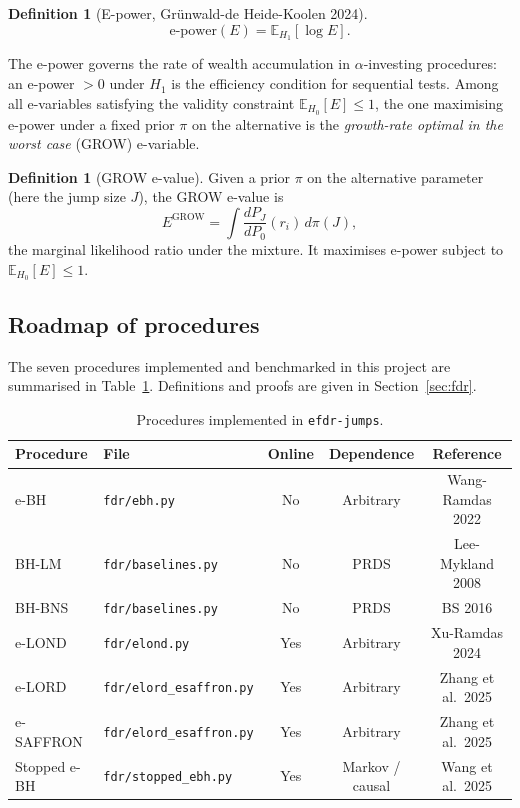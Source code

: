 \documentclass[11pt,a4paper,twocolumn]{article}
\theoremstyle{plain}
\theoremstyle{definition}
\newtheorem{definition}[theorem]{Definition}
\theoremstyle{remark}
\newcommand{\E}{\mathbb{E}}
\begin{document}
\begin{definition}[E-power, Gr\"unwald-de Heide-Koolen 2024]
\[
  \mathrm{e\text{-}power}(E) = \E_{H_1}[\log E].
\]
\end{definition}

The e-power governs the rate of wealth accumulation in $\alpha$-investing
procedures: an e-power $> 0$ under $H_1$ is the efficiency condition for
sequential tests. Among all e-variables satisfying the validity constraint
$\E_{H_0}[E] \le 1$, the one maximising e-power under a fixed prior $\pi$ on
the alternative is the \emph{growth-rate optimal in the worst case} (GROW)
e-variable.

\begin{definition}[GROW e-value]
Given a prior $\pi$ on the alternative parameter (here the jump size $J$),
the GROW e-value is
\[
  E^{\mathrm{GROW}} = \int \frac{dP_J}{dP_0}(r_i)\,d\pi(J),
\]
the marginal likelihood ratio under the mixture. It maximises e-power subject
to $\E_{H_0}[E] \leq 1$.
\end{definition}

\subsection{Roadmap of procedures}

The seven procedures implemented and benchmarked in this project are
summarised in Table~\ref{tab:procs}. Definitions and proofs are given in
Section~\ref{sec:fdr}.

\begin{table}[t]
\centering
\caption{Procedures implemented in \texttt{efdr-jumps}.}
\label{tab:procs}
\begin{tabular}{llccc}
\toprule
Procedure & File & Online & Dependence & Reference \\
\midrule
e-BH & \texttt{fdr/ebh.py} & No & Arbitrary & Wang-Ramdas 2022 \\
BH-LM & \texttt{fdr/baselines.py} & No & PRDS & Lee-Mykland 2008 \\
BH-BNS & \texttt{fdr/baselines.py} & No & PRDS & BS 2016 \\
e-LOND & \texttt{fdr/elond.py} & Yes & Arbitrary & Xu-Ramdas 2024 \\
e-LORD & \texttt{fdr/elord\_esaffron.py} & Yes & Arbitrary & Zhang et al.\ 2025 \\
e-SAFFRON & \texttt{fdr/elord\_esaffron.py} & Yes & Arbitrary & Zhang et al.\ 2025 \\
Stopped e-BH & \texttt{fdr/stopped\_ebh.py} & Yes & Markov / causal & Wang et al.\ 2025 \\
\bottomrule
\end{tabular}
\end{table}
\end{document}
